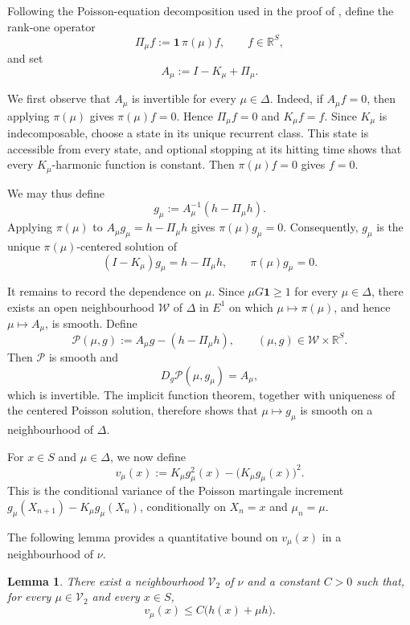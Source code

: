 \documentclass[10pt,letterpaper]{article}
\theoremstyle{compactplain}
\newtheorem{lemma}[theorem]{Lemma}
\theoremstyle{compactdefinition}
\newcommand{\1}{\mathds{1}}
\begin{document}
Following the Poisson-equation decomposition used in the proof of
\cite[Lemma~2.4]{BC2015}, define the rank-one operator
\[
\Pi_\mu f:=\mathbf 1\,\pi(\mu)f,
\qquad
f\in\mathbb R^S,
\]
and set
\[
A_\mu:=I-K_\mu+\Pi_\mu.
\]

We first observe that \(A_\mu\) is invertible for every \(\mu\in\Delta\).
Indeed, if \(A_\mu f=0\), then applying \(\pi(\mu)\) gives
\(\pi(\mu)f=0\). Hence \(\Pi_\mu f=0\) and \(K_\mu f=f\). Since \(K_\mu\)
is indecomposable, choose a state in its unique recurrent class. This state is
accessible from every state, and optional stopping at its hitting time shows
that every \(K_\mu\)-harmonic function is constant. Then
\(\pi(\mu)f=0\) gives \(f=0\).

We may thus define
\[
g_\mu
:=
A_\mu^{-1}(h-\Pi_\mu h).
\]
Applying \(\pi(\mu)\) to
\(A_\mu g_\mu=h-\Pi_\mu h\) gives
\(\pi(\mu)g_\mu=0\). Consequently, \(g_\mu\) is the unique
\(\pi(\mu)\)-centered solution of
\begin{equation}
\label{eq:defpoisson}
(I-K_\mu)g_\mu
=
h-\Pi_\mu h,
\qquad
\pi(\mu)g_\mu=0.
\end{equation}

It remains to record the dependence on \(\mu\). Since
\(\mu G\mathbf 1\geq1\) for every \(\mu\in\Delta\), there exists an open
neighbourhood \(\mathcal W\) of \(\Delta\) in \(E^1\) on which
\(\mu\mapsto\pi(\mu)\), and hence \(\mu\mapsto A_\mu\), is smooth. Define
\[
\mathscr P(\mu,g)
:=
A_\mu g-(h-\Pi_\mu h),
\qquad
(\mu,g)\in\mathcal W\times\mathbb R^S.
\]
Then \(\mathscr P\) is smooth and
\[
D_g\mathscr P(\mu,g_\mu)=A_\mu,
\]
which is invertible. The implicit function theorem, together with uniqueness
of the centered Poisson solution, therefore shows that
\(\mu\mapsto g_\mu\) is smooth on a neighbourhood of \(\Delta\).





For \(x\in S\) and \(\mu\in\Delta\), we now define
\begin{equation}
\label{eq:def-vmu}
v_\mu(x)
:=
K_\mu g_\mu^2(x)-\bigl(K_\mu g_\mu(x)\bigr)^2.
\end{equation}
This is the conditional variance of the Poisson martingale increment
\(g_\mu(X_{n+1})-K_\mu g_\mu(X_n)\), conditionally on \(X_n=x\) and
\(\mu_n=\mu\).

The following lemma provides a quantitative bound on \(v_\mu(x)\) in a
neighbourhood of \(\nu\).

\begin{lemma}
\label{lem:boundvariance}
There exist a neighbourhood \(\mathcal V_2\) of \(\nu\) and a constant \(C >0\) such that, for every \(\mu\in\mathcal V_2\) and every \(x\in S\),
\[
v_\mu(x)\leq C\bigl(h(x)+\mu h\bigr).
\]
\end{lemma}
\end{document}
